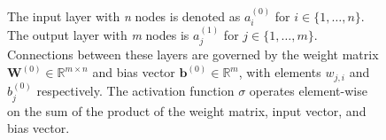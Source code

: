 \begin{figure}
{\begin{tikzpicture}[x=2.7cm,y=1.6cm]
\end{tikzpicture}
}
\caption[Activation function \cite{tikz}.]{\small{The input layer with \textit{n} nodes is denoted as $a_i^{(0)}$ for $i \in \{1, \ldots, n\}$. The output layer with \textit{m} nodes is $a_j^{(1)}$ for $j \in \{1, \ldots, m\}$. Connections between these layers are governed by the weight matrix $\mathbf{W}^{(0)} \in \mathbb{R}^{m\times n}$ and bias vector $\mathbf{b}^{(0)} \in \mathbb{R}^{m}$, with elements $w_{j,i}$ and $b_j^{(0)}$ respectively. The activation function $\sigma$ operates element-wise on the sum of the product of the weight matrix, input vector, and bias vector.}}


    \label{fig:activation_function}

\end{figure}